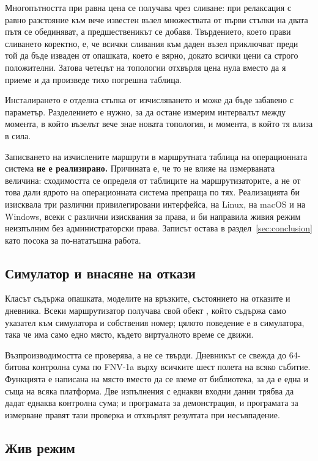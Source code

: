 Многопътността при равна цена се получава чрез сливане: при релаксация с равно разстояние
към вече известен възел множествата от първи стъпки на двата пътя се обединяват, а
предшественикът се добавя. Твърдението, което прави сливането коректно, е, че всички
сливания към даден възел приключват преди той да бъде изваден от опашката, което е вярно,
докато всички цени са строго положителни. Затова четецът на топологии отхвърля цена нула
вместо да я приеме и да произведе тихо погрешна таблица.

Инсталирането е отделна стъпка от изчисляването и може да бъде забавено с параметър.
Разделението е нужно, за да остане измерим интервалът между момента, в който възелът вече
знае новата топология, и момента, в който тя влиза в сила.

Записването на изчислените маршрути в маршрутната таблица на операционната система
\textbf{не е реализирано.} Причината е, че то не влияе на измерваната величина: сходимостта
се определя от таблиците на маршрутизаторите, а не от това дали ядрото на операционната
система препраща по тях. Реализацията би изисквала три различни привилегировани интерфейса,
 на Linux,  на macOS и  на Windows, всеки с
различни изисквания за права, и би направила живия режим неизпълним без администраторски
права. Записът остава в раздел~\ref{sec:conclusion} като посока за по-нататъшна работа.

\subsection{Симулатор и внасяне на откази}

Класът  съдържа опашката, моделите на връзките, състоянието на отказите и
дневника. Всеки маршрутизатор получава свой обект , който съдържа само
указател към симулатора и собствения номер; цялото поведение е в симулатора, така че има
само едно място, където виртуалното време се движи.

Възпроизводимостта се проверява, а не се твърди. Дневникът се свежда до 64-битова
контролна сума по FNV-1a върху всичките шест полета на всяко събитие. Функцията е написана
на място вместо да се вземе от библиотека, за да е една и съща на всяка платформа. Две
изпълнения с еднакви входни данни трябва да дадат еднаква контролна сума; и програмата за
демонстрация, и програмата за измерване правят тази проверка и отхвърлят резултата при
несъвпадение.

\subsection{Жив режим}

